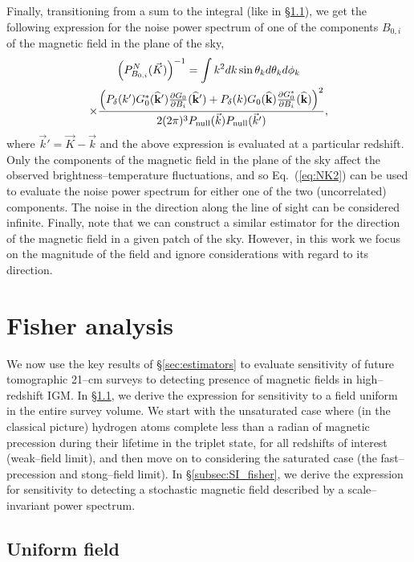 \documentclass[aps,prd,twocolumn,floatfix,showpacs,superscriptaddress,nofootinbib]{revtex4-1}
\newcommand{\beq}{\begin{equation}}
\newcommand{\eeq}{\end{equation}}
\newcommand{\bga}{\begin{gathered}}
\newcommand{\ega}{\end{gathered}}
\begin{document}
Finally, transitioning from a sum to the integral (like in \S\ref{subsec:uniform_fisher}), we get the following expression for the noise power spectrum of one of the components $B_{0,i}$ of the magnetic field in the plane of the sky,
\beq
\bga
\left(P^N_{B_{0,i}}(\vec K)\right)^{-1} = \int k^2d{k}\sin \theta_kd\theta_kd\phi_k \\
\times\frac{\left(P_\delta(k')G_0^*({\bf{\widehat k'}})\frac{\partial G_0}{\partial B_i}({\bf{\widehat k'}}) + P_\delta(k)G_0({\bf{\widehat k}})\frac{\partial G_0^*}{\partial B_i}({\bf{\widehat k}})\right)^2}{2(2\pi)^3P_\text{null}(\vec k) P_\text{null}(\vec k') } ,
\ega
\label{eq:NK2}
\eeq
where $\vec k'=\vec K -\vec k$ and the above expression is evaluated at a particular redshift. Only the components of the magnetic field in the plane of the sky affect the observed brightness--temperature fluctuations, and so Eq.~(\ref{eq:NK2}) can be used to evaluate the noise power spectrum for either one of the two (uncorrelated) components. The noise in the direction along the line of sight can be considered infinite. Finally, note that we can construct a similar estimator for the direction of the magnetic field in a given patch of the sky. However, in this work we focus on the magnitude of the field and ignore considerations with regard to its direction.

\section{Fisher analysis}
\label{sec:fisher}

We now use the key results of \S\ref{sec:estimators} to evaluate sensitivity of future tomographic 21--cm surveys to detecting presence of magnetic fields in high--redshift IGM. In \S\ref{subsec:uniform_fisher}, we derive the expression for sensitivity to a field uniform in the entire survey volume. We start with the unsaturated case where (in the classical picture) hydrogen atoms complete less than a radian of magnetic precession during their lifetime in the triplet state, for all redshifts of interest (weak--field limit), and then move on to considering the saturated case (the fast--precession and stong--field limit). In \S\ref{subsec:SI_fisher}, we derive the expression for sensitivity to detecting a stochastic magnetic field described by a scale--invariant power spectrum.

\subsection{Uniform field}
\label{subsec:uniform_fisher}
\end{document}
